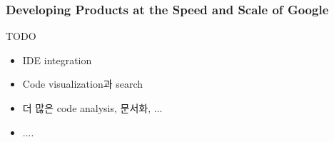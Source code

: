 \begin{frame}
\frametitle{Developing Products at the Speed and Scale of Google}

TODO

\begin{itemize}
\item IDE integration 
\item Code visualization과 search
\item 더 많은 code analysis, 문서화, ...
\item .... 
\end{itemize}


\end{frame}
